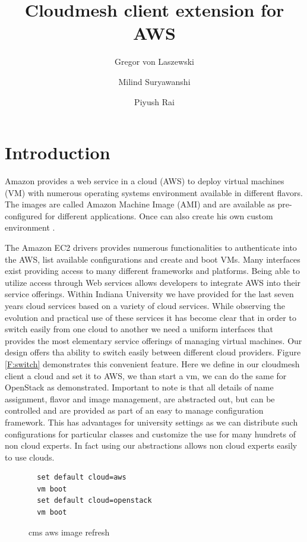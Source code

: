 \documentclass[9pt,twocolumn,twoside]{../../styles/osajnl}
\title{Cloudmesh client extension for AWS}
\author[1]{Gregor von Laszewski}
\author[1]{Milind Suryawanshi}
\author[1]{Piyush Rai}
\affil[1]{School of Informatics and Computing, Bloomington, IN 47408, U.S.A.}
\begin{document}
\maketitle

\section{Introduction}



Amazon provides a web service in a cloud (AWS) to deploy
virtual machines (VM) with numerous operating systems environment
available in different flavors. The images are called Amazon Machine
Image (AMI) and are available as pre-configured for different
applications. Once can also create his own custom environment
\cite{www-amazon-ec2}.

The Amazon EC2 drivers provides numerous functionalities to
authenticate into the AWS, list available configurations and create
and boot VMs. Many interfaces exist providing access to many different
frameworks and platforms. Being able to utilize access through Web
services allows developers to integrate AWS into their service
offerings. Within Indiana University we have provided for the last
seven years cloud services based on a variety of cloud services.
While observing the evolution and practical use of these services it
has become clear that in order to switch easily from one cloud to
another we need a uniform interfaces that provides the most elementary
service offerings of managing virtual machines. Our design offers tha
ability to switch easily between different cloud providers. Figure
\ref{F:switch} demonstrates this convenient feature. Here we define in
our cloudmesh client a cloud and set it to AWS, we than start a vm, we
can do the same for OpenStack as demonstrated. Important to note is
that all details of name assignment, flavor and image management, are
abstracted out, but can be controlled and are provided as part of an
easy to manage configuration framework. This has advantages for
university settings as we can distribute such configurations for
particular classes and customize the use for many hundrets of non
cloud experts. In fact using our abstractions allows non cloud experts
easily to use clouds. 

\begin{figure}[htb]
  \centering
  \begin{verbatim}
  set default cloud=aws
  vm boot
  set default cloud=openstack
  vm boot 
  \end{verbatim}
  \vspace{-2.0\baselineskip}
  \caption{cms aws image refresh}
  \label{fig:imagerefresh}
\end{figure}
		
\end{document}

